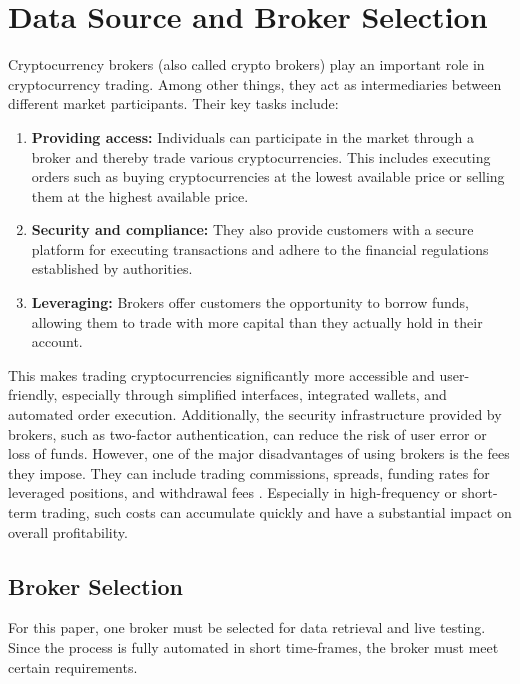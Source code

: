 \section{Data Source and Broker Selection}
\label{chap:broker}

Cryptocurrency brokers (also called crypto brokers) play an important role in cryptocurrency trading.
Among other things, they act as intermediaries between different market participants.
Their key tasks include:

\begin{enumerate}
    \item \textbf{Providing access:} Individuals can participate in the market through a broker and thereby trade various cryptocurrencies.
    This includes executing orders such as buying cryptocurrencies at the lowest available price or selling them at the highest available price.
    \item \textbf{Security and compliance:} They also provide customers with a secure platform for executing transactions and adhere to the financial regulations established by authorities.
    \item \textbf{Leveraging:} Brokers offer customers the opportunity to borrow funds, allowing them to trade with more capital than they actually hold in their account.
\end{enumerate}


\noindent
This makes trading cryptocurrencies significantly more accessible and user-friendly, especially through simplified interfaces, integrated wallets, and automated order execution.
Additionally, the security infrastructure provided by brokers, such as two-factor authentication, can reduce the risk of user error or loss of funds.
However, one of the major disadvantages of using brokers is the fees they impose.
They can include trading commissions, spreads, funding rates for leveraged positions, and withdrawal fees \cite{broker-investing}.
Especially in high-frequency or short-term trading, such costs can accumulate quickly and have a substantial impact on overall profitability.

\subsection{Broker Selection}
\label{chap:broker-selection}

For this paper, one broker must be selected for data retrieval and live testing.
Since the process is fully automated in short time-frames, the broker must meet certain requirements.

